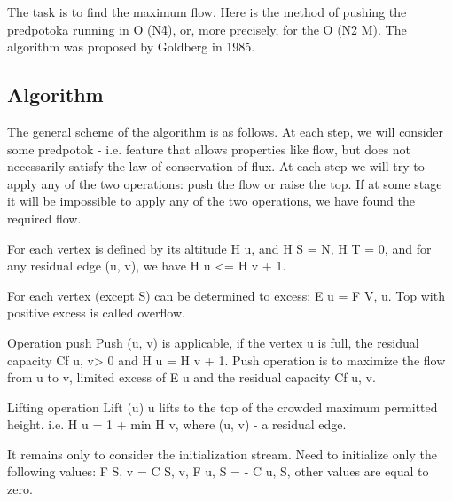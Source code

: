 The task is to find the maximum flow. Here is the method of pushing the predpotoka running in O (N\^4), or, more precisely, for the O (N\^2 M). The algorithm was proposed by Goldberg in 1985.

\subsection{ Algorithm }
The general scheme of the algorithm is as follows. At each step, we will consider some predpotok - i.e. feature that allows properties like flow, but does not necessarily satisfy the law of conservation of flux. At each step we will try to apply any of the two operations: push the flow or raise the top. If at some stage it will be impossible to apply any of the two operations, we have found the required flow.

For each vertex is defined by its altitude H u, and H S = N, H T = 0, and for any residual edge (u, v), we have H u <= H v + 1.

For each vertex (except S) can be determined to excess: E u = F V, u. Top with positive excess is called overflow.

Operation push Push (u, v) is applicable, if the vertex u is full, the residual capacity Cf u, v> 0 and H u = H v + 1. Push operation is to maximize the flow from u to v, limited excess of E u and the residual capacity Cf u, v.

Lifting operation Lift (u) u lifts to the top of the crowded maximum permitted height. i.e. H u = 1 + min {H v}, where (u, v) - a residual edge.

It remains only to consider the initialization stream. Need to initialize only the following values: F S, v = C S, v, F u, S = - C u, S, other values ​​are equal to zero.

